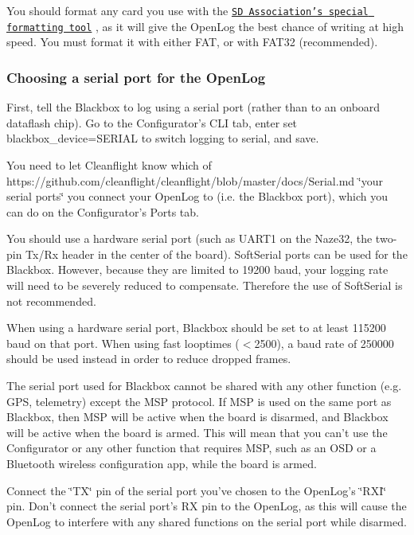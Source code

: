 You should format any card you use with the \href{https://www.sdcard.org/downloads/formatter_4/}{\tt S\+D Association's special formatting tool} , as it will give the Open\+Log the best chance of writing at high speed. You must format it with either F\+A\+T, or with F\+A\+T32 (recommended).

\subsubsection*{Choosing a serial port for the Open\+Log}

First, tell the Blackbox to log using a serial port (rather than to an onboard dataflash chip). Go to the Configurator's C\+L\+I tab, enter {\ttfamily set blackbox\+\_\+device=S\+E\+R\+I\+A\+L} to switch logging to serial, and save.

You need to let Cleanflight know which of https\+://github.com/cleanflight/cleanflight/blob/master/docs/\+Serial.\+md \char`\"{}your serial ports\char`\"{} you connect your Open\+Log to (i.\+e. the Blackbox port), which you can do on the Configurator's Ports tab.

You should use a hardware serial port (such as U\+A\+R\+T1 on the Naze32, the two-\/pin Tx/\+Rx header in the center of the board). Soft\+Serial ports can be used for the Blackbox. However, because they are limited to 19200 baud, your logging rate will need to be severely reduced to compensate. Therefore the use of Soft\+Serial is not recommended.

When using a hardware serial port, Blackbox should be set to at least 115200 baud on that port. When using fast looptimes ($<$2500), a baud rate of 250000 should be used instead in order to reduce dropped frames.

The serial port used for Blackbox cannot be shared with any other function (e.\+g. G\+P\+S, telemetry) except the M\+S\+P protocol. If M\+S\+P is used on the same port as Blackbox, then M\+S\+P will be active when the board is disarmed, and Blackbox will be active when the board is armed. This will mean that you can't use the Configurator or any other function that requires M\+S\+P, such as an O\+S\+D or a Bluetooth wireless configuration app, while the board is armed.

Connect the \char`\"{}\+T\+X\char`\"{} pin of the serial port you've chosen to the Open\+Log's \char`\"{}\+R\+X\+I\char`\"{} pin. Don't connect the serial port's R\+X pin to the Open\+Log, as this will cause the Open\+Log to interfere with any shared functions on the serial port while disarmed.


